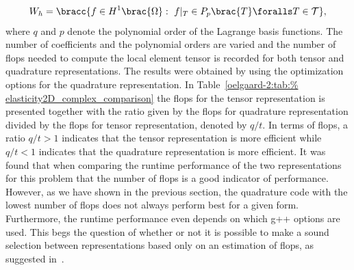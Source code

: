 \begin{equation}
  W_{h} = \bracc{f \in H^{1}\brac{\Omega}: \ f\vert_T \in
    P_{p}\brac{T} \foralls T \in \mathcal{T}},
 \label{oelgaard-2:eq:elasticity_H1_space}
\end{equation}
%
where $q$ and $p$ denote the polynomial order of the
Lagrange basis functions.  The number of coefficients and the
polynomial orders are varied and the number of flops needed to compute
the local element tensor is recorded for both tensor and quadrature
representations.  The results were obtained by using the optimization
options  for the
quadrature representation.  In Table~\ref{oelgaard-2:tab:%
elasticity2D_complex_comparison} the flops for the tensor
representation is presented together with the ratio given by the flops
for quadrature representation divided by the flops for tensor
representation, denoted by $q/t$.  In terms of flops, a ratio $q/t >
1$ indicates that the tensor representation is more efficient while
$q/t < 1$ indicates that the quadrature representation is more
efficient.  It was found that when comparing the runtime performance
of the two representations for this problem that the number of flops
is a good indicator of performance.  However, as we have shown in the
previous section, the quadrature code with the lowest number of flops
does not always perform best for a given form. Furthermore, the
runtime performance even depends on which g++ options are used.  This
begs the question of whether or not it is possible to make a sound
selection between representations based only on an estimation of
flops, as suggested in~\citet{OelgaardWells2010}.

